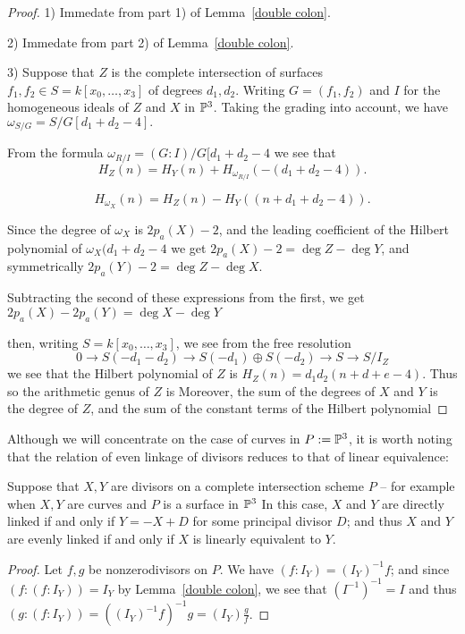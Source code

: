 \begin{proof}
 1) Immedate from part 1) of Lemma~\ref{double colon}.
 
 2) Immedate from part 2) of Lemma~\ref{double colon}.
 
3) Suppose that $Z$ is the complete intersection of surfaces $f_{1}, f_{2} \in S = k[x_{0},\dots,x_{3}]$ of degrees $d_{1}, d_{2}$. Writing
$G = (f_{1}, f_{2})$ and $I$ for the homogeneous ideals of $Z$ and $X$ in ${\mathbb P}^{3}$. Taking the grading into
account, we have $\omega_{S/G} = S/G[d_{1}+d_{2}-4].$

From the formula  $\omega_{R/I} = (G:I)/G[d_{1}+d_{2}-4$ we see that 
$$
H_{Z}(n) = H_{Y}(n) + H_{\omega_{R/I}}(-(d_{1}+d_{2}-4)).
$$

$$
H_{\omega_{X}}(n) = H_{Z}(n) - H_{Y}((n+d_{1}+d_{2}-4) ).
$$

Since the degree of $\omega_{X}$ is $2p_{a}(X) -2$, and the leading coefficient of the 
Hilbert polynomial of $\omega_{X}(d_{1}+d_{2}-4$ we get 
$2p_{a}(X) -2 = \deg Z - \deg Y$, and symmetrically 
$2p_{a}(Y) -2 = \deg Z - \deg X$.

Subtracting the second of these expressions from the first, we get
$2p_{a}(X)-2p_{a}(Y) = \deg X -\deg Y$

 then, writing $S = k[x_{0},\dots, x_{3}]$, we see from the free resolution
$$
0\to S(-d_{1}-d_{2}) \to S(-d_{1})\oplus S(-d_{2}) \to S \to S/I_{Z}
$$
we see that the Hilbert polynomial of $Z$ is $H_{Z}(n)= d_{1}d_{2}(n + d+e-4)$. Thus so the arithmetic genus of $Z$ is Moreover, the sum of the degrees of $X$ and $Y$ is the degree of $Z$, and
the sum of the constant terms of the Hilbert polynomial
\end{proof}



Although we will concentrate on the case of curves in $P:={\mathbb P}^3$, it is worth noting that the relation of even linkage of divisors reduces to
that of linear equivalence:

\begin{proposition}
Suppose that $X,Y$ are divisors on a complete intersection scheme $P$ -- for example when $X,Y$ are curves and $P$ is a surface in ${\mathbb P}^3$ In this case, $X$ and $Y$ are directly linked if and only if $Y = -X +D$ for some principal divisor
$D$; and thus $X$ and $Y$ are evenly linked if and only if $X$ is linearly equivalent to $Y$.
\end{proposition}
\begin{proof}
Let $f,g$ be nonzerodivisors on $P$.
We have $(f:I_Y) = (I_Y)^{-1}f$; and since $(f:(f:I_Y)) = I_Y$ by Lemma~\ref{double colon}, we see that $(I^{-1})^{-1} = I$ and thus
$(g:(f:I_Y)) = ((I_Y)^{-1}f)^{-1}g = (I_Y)\frac{g}{f}$.
\end{proof}

